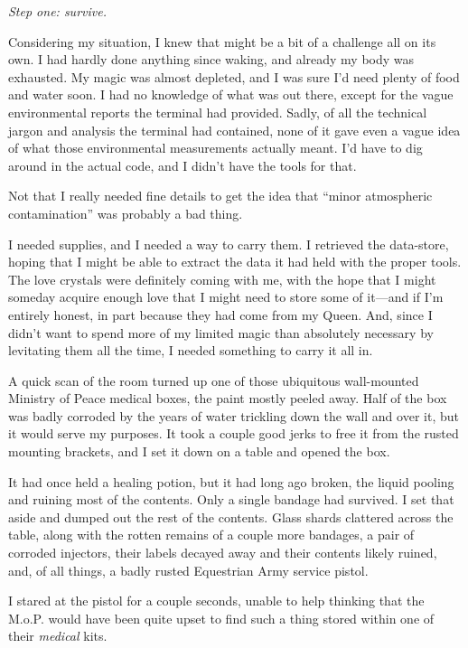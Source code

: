 \textit{Step one: survive.}

Considering my situation, I knew that might be a bit of a challenge all on its own. I had hardly done anything since waking, and already my body was exhausted. My magic was almost depleted, and I was sure I’d need plenty of food and water soon. I had no knowledge of what was out there, except for the vague environmental reports the terminal had provided. Sadly, of all the technical jargon and analysis the terminal had contained, none of it gave even a vague idea of what those environmental measurements actually meant. I’d have to dig around in the actual code, and I didn’t have the tools for that.

Not that I really needed fine details to get the idea that “minor atmospheric contamination” was probably a bad thing.

I needed supplies, and I needed a way to carry them. I retrieved the data-store, hoping that I might be able to extract the data it had held with the proper tools. The love crystals were definitely coming with me, with the hope that I might someday acquire enough love that I might need to store some of it—and if I’m entirely honest, in part because they had come from my Queen. And, since I didn’t want to spend more of my limited magic than absolutely necessary by levitating them all the time, I needed something to carry it all in.

A quick scan of the room turned up one of those ubiquitous wall-mounted Ministry of Peace medical boxes, the paint mostly peeled away. Half of the box was badly corroded by the years of water trickling down the wall and over it, but it would serve my purposes. It took a couple good jerks to free it from the rusted mounting brackets, and I set it down on a table and opened the box.

It had once held a healing potion, but it had long ago broken, the liquid pooling and ruining most of the contents. Only a single bandage had survived. I set that aside and dumped out the rest of the contents. Glass shards clattered across the table, along with the rotten remains of a couple more bandages, a pair of corroded injectors, their labels decayed away and their contents likely ruined, and, of all things, a badly rusted Equestrian Army service pistol.

I stared at the pistol for a couple seconds, unable to help thinking that the M.o.P. would have been quite upset to find such a thing stored within one of their \textit{medical} kits.

